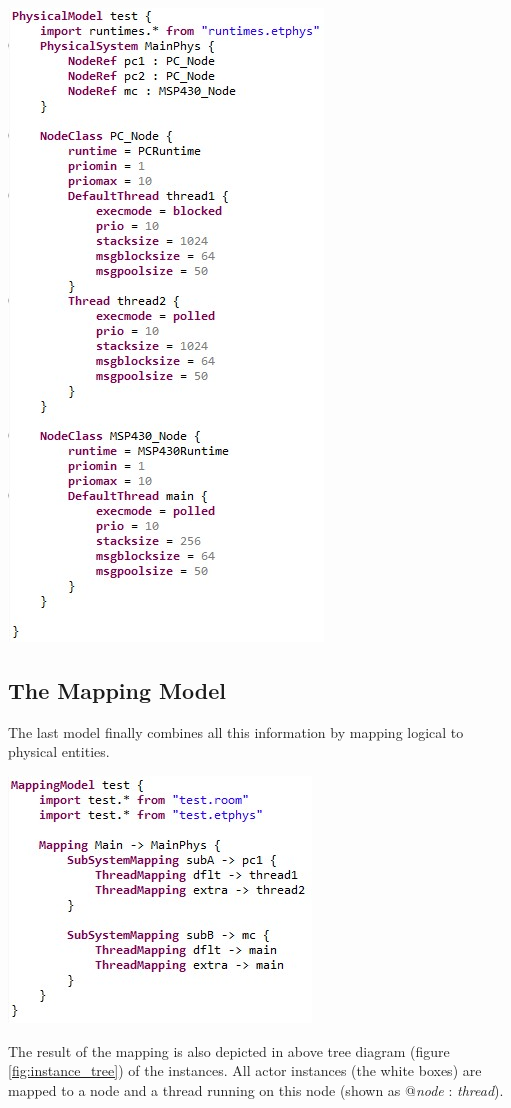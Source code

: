 \includegraphics{images/080-phys.jpg}

\subsection{The Mapping Model}
\label{sec:mapping_model}

The last model finally combines all this information by mapping logical to physical entities.

\includegraphics{images/080-map.jpg}

The result of the mapping is also depicted in above tree diagram (figure \ref{fig:instance_tree})
of the instances. All actor instances (the white boxes) are mapped to a node and a thread running on this node
(shown as @\textit{node} : \textit{thread}).
